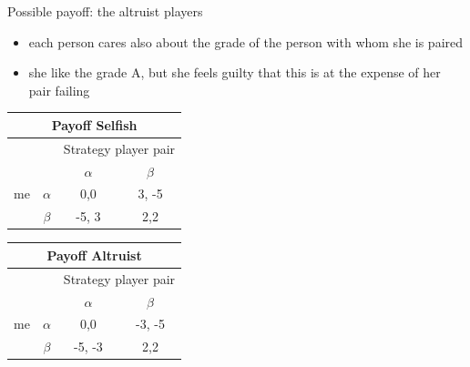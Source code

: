 \documentclass{beamer}
\begin{document}
\begin{frame}{Possible payoff: the altruist players}
  \begin{itemize}
  \item each person cares also about the grade of the person with whom
    she is paired
  \item she like the grade A, but she feels guilty that this is at the
    expense of her pair failing
  \end{itemize}

\begin{center}
  \begin{tabular}{|c|c|c|c|}
    \hline
    \multicolumn{4}{|c|}{Payoff Selfish}\\
    \hline
 &
&
\multicolumn{2}{|c|}{Strategy player pair}\\
    \hline
 & 
     & $\alpha$ & $\beta$  \\
    \hline
me & $\alpha$
     & 0,0 & 3, -5 \\
    \hline
 & $\beta$
     & -5, 3 & 2,2 \\
    \hline
  \end{tabular}

  \begin{tabular}{|c|c|c|c|}
    \hline
    \multicolumn{4}{|c|}{Payoff Altruist}\\
    \hline
 &
&
\multicolumn{2}{|c|}{Strategy player pair}\\
    \hline
 & 
     & $\alpha$ & $\beta$  \\
    \hline
me & $\alpha$
     & 0,0 & -3, -5 \\
    \hline
 & $\beta$
     & -5, -3 & 2,2 \\
    \hline
  \end{tabular}
\end{center}

\end{frame}
\end{document}
